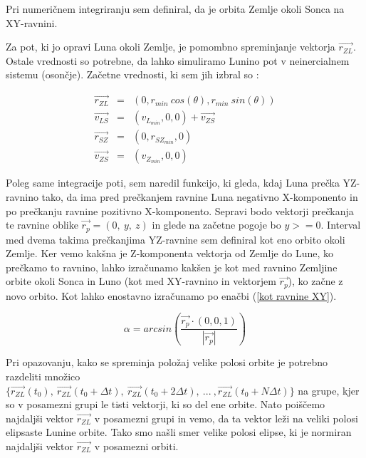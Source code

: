 \documentclass[titlepage,12pt,a4paper]{article}
\begin{document}
Pri numeričnem integriranju sem definiral, da je orbita Zemlje okoli Sonca na XY-ravnini.

Za pot, ki jo opravi Luna okoli Zemlje, je pomombno spreminjanje vektorja $\overrightarrow{r_{ZL}}$. Ostale vrednosti so potrebne, da lahko simuliramo Lunino pot v neinercialnem sistemu (osončje). Začetne vrednosti, ki sem jih izbral so :

\begin{large}
\begin{eqnarray}
\overrightarrow{r_{ZL}} &=& \left(0, r_{min}\ cos(\theta), r_{min}\ sin(\theta) \right) \\
\overrightarrow{v_{LS}} &=& \left(v_{L_{min}}, 0, 0\right) + \overrightarrow{v_{ZS}} \\
\overrightarrow{r_{SZ}} &=& \left(0, r_{SZ_{min}}, 0\right) \\
\overrightarrow{v_{ZS}} &=& \left(v_{Z_{min}}, 0, 0 \right) 
\end{eqnarray}
\end{large}

Poleg same integracije poti, sem naredil funkcijo, ki gleda, kdaj Luna prečka YZ-ravnino tako, da ima pred prečkanjem ravnine Luna negativno X-komponento in po prečkanju ravnine pozitivno X-komponento. Sepravi bodo vektorji prečkanja te ravnine oblike $\overrightarrow{r_{p}} = (0,\ y,\ z)$ in glede na začetne pogoje bo $y >= 0$. Interval med dvema takima prečkanjima YZ-ravnine sem definiral kot eno orbito okoli Zemlje. Ker vemo kakšna je Z-komponenta vektorja od Zemlje do Lune, ko prečkamo to ravnino, lahko izračunamo kakšen je kot med ravnino Zemljine orbite okoli Sonca in Luno (kot med XY-ravnino in vektorjem $\overrightarrow{r_{p}}$), ko začne z novo orbito. Kot lahko enostavno izračunamo po enačbi (\ref{kot ravnine XY}).

\begin{large}
\begin{equation}
\alpha = arcsin\left(\frac{\overrightarrow{r_{p}} \cdot \left(0, 0, 1\right)}{|\overrightarrow{r_{p}}|}\right) \label{kot ravnine XY}
\end{equation}
\end{large}

Pri opazovanju, kako se spreminja položaj velike polosi orbite je potrebno razdeliti množico $\{\overrightarrow{r_{ZL}}(t_0),\ \overrightarrow{r_{ZL}}(t_0 + \varDelta t),\ \overrightarrow{r_{ZL}}(t_0 + 2\varDelta t),\ ...\ , \overrightarrow{r_{ZL}}(t_0 + N\varDelta t)\} $ na grupe, kjer so v posamezni grupi le tisti vektorji, ki so del ene orbite. Nato poiščemo najdaljši vektor $\overrightarrow{r_{ZL}}$ v posamezni grupi in vemo, da ta vektor leži na veliki polosi elipsaste Lunine orbite. Tako smo našli smer velike polosi elipse, ki je normiran najdaljši vektor $\overrightarrow{r_{ZL}}$ v posamezni orbiti.
\end{document}
